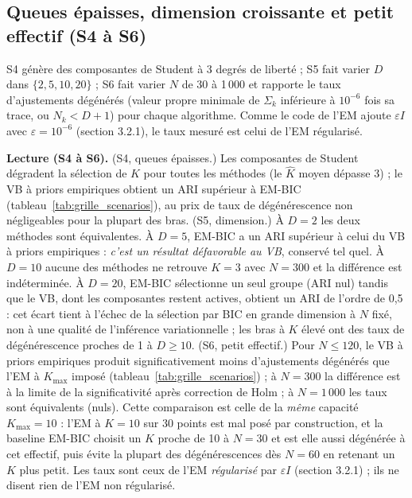 \subsection{Queues épaisses, dimension croissante et petit effectif (S4 à S6)}
S4 génère des composantes de Student à 3 degrés de liberté ; S5 fait varier $D$ dans $\{2, 5, 10, 20\}$ ; S6 fait varier $N$ de 30 à 1\,000 et rapporte le taux d'ajustements dégénérés (valeur propre minimale de $\Sigma_k$ inférieure à $10^{-6}$ fois sa trace, ou $N_k < D+1$) pour chaque algorithme. Comme le code de l'EM ajoute $\varepsilon I$ avec $\varepsilon = 10^{-6}$ (section 3.2.1), le taux mesuré est celui de l'EM régularisé.


\textbf{Lecture (S4 à S6). }(S4, queues épaisses.) Les composantes de Student dégradent la sélection de $K$ pour toutes les méthodes (le $\hat K$ moyen dépasse 3) ; le VB à priors empiriques obtient un ARI supérieur à EM-BIC (tableau~\ref{tab:grille_scenarios}), au prix de taux de dégénérescence non négligeables pour la plupart des bras. (S5, dimension.) À $D=2$ les deux méthodes sont équivalentes. À $D=5$, EM-BIC a un ARI supérieur à celui du VB à priors empiriques : \emph{c'est un résultat défavorable au VB}, conservé tel quel. À $D=10$ aucune des méthodes ne retrouve $K=3$ avec $N=300$ et la différence est indéterminée. À $D=20$, EM-BIC sélectionne un seul groupe (ARI nul) tandis que le VB, dont les composantes restent actives, obtient un ARI de l'ordre de 0,5 : cet écart tient à l'échec de la sélection par BIC en grande dimension à $N$ fixé, non à une qualité de l'inférence variationnelle ; les bras à $K$ élevé ont des taux de dégénérescence proches de 1 à $D \geq 10$. (S6, petit effectif.) Pour $N \leq 120$, le VB à priors empiriques produit significativement moins d'ajustements dégénérés que l'EM à $K_{\max}$ imposé (tableau~\ref{tab:grille_scenarios}) ; à $N=300$ la différence est à la limite de la significativité après correction de Holm ; à $N=1\,000$ les taux sont équivalents (nuls). Cette comparaison est celle de la \emph{même} capacité $K_{\max}=10$ : l'EM à $K=10$ sur 30 points est mal posé par construction, et la baseline EM-BIC choisit un $K$ proche de 10 à $N=30$ et est elle aussi dégénérée à cet effectif, puis évite la plupart des dégénérescences dès $N=60$ en retenant un $K$ plus petit. Les taux sont ceux de l'EM \emph{régularisé} par $\varepsilon I$ (section 3.2.1) ; ils ne disent rien de l'EM non régularisé.

